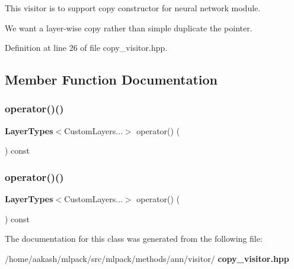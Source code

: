 This visitor is to support copy constructor for neural network module. 

We want a layer-\/wise copy rather than simple duplicate the pointer. 

Definition at line 26 of file copy\+\_\+visitor.\+hpp.



\subsection{Member Function Documentation}
\mbox{\label{classmlpack_1_1ann_1_1CopyVisitor_a0328fbed2c4b8458119a706e16921639}} 
\subsubsection{operator()()\hspace{0.1cm}{\footnotesize\ttfamily [1/2]}}
{\footnotesize\ttfamily \textbf{ Layer\+Types}$<$Custom\+Layers...$>$ operator() (\begin{DoxyParamCaption}\item[{Layer\+Type $\ast$}]{ }\end{DoxyParamCaption}) const}

\mbox{\label{classmlpack_1_1ann_1_1CopyVisitor_a8229a3baafceb83bbf28a6bfd8b62d93}} 
\subsubsection{operator()()\hspace{0.1cm}{\footnotesize\ttfamily [2/2]}}
{\footnotesize\ttfamily \textbf{ Layer\+Types}$<$Custom\+Layers...$>$ operator() (\begin{DoxyParamCaption}\item[{\textbf{ More\+Types}}]{ }\end{DoxyParamCaption}) const}



The documentation for this class was generated from the following file\+:\begin{DoxyCompactItemize}
\item 
/home/aakash/mlpack/src/mlpack/methods/ann/visitor/\textbf{ copy\+\_\+visitor.\+hpp}\end{DoxyCompactItemize}
